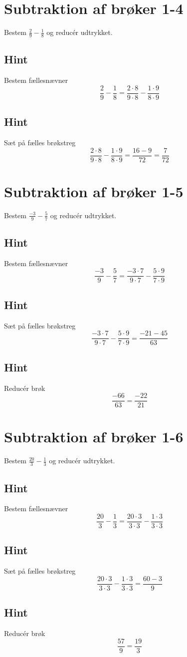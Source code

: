\documentclass{article}
\newenvironment{exercise}[1]{\newpage\section{#1}}{}
\newcommand{\answerbox}[1]{\fbox{$#1$}}
\newcommand{\hint}{\subsection*{Hint}}
\begin{document}
	\newpage
	
	\begin{exercise}{Subtraktion af brøker 1-4}
		
		Bestem $\frac{2}{9}-\frac{1}{8}$ og reducér udtrykket.
		
		\answerbox{\frac{7}{72}}
		
		\hint
		
		Bestem fællesnævner
		\[
		\frac{2}{9}-\frac{1}{8}  = \frac{2 \cdot 8}{9 \cdot 8}-\frac{1 \cdot 9}{8\cdot 9} 
		\]
		
		\hint
		
		Sæt på fælles brøkstreg
		\[
		\frac{2 \cdot 8}{9 \cdot 8}-\frac{1 \cdot 9}{8\cdot 9}    = \frac{16-9}{72}  = \frac{7}{72}
		\]
		
		
	\end{exercise}
	
	\newpage
	
	\begin{exercise}{Subtraktion af brøker 1-5}
		
		Bestem $\frac{-3}{9}-\frac{5}{7}$ og reducér udtrykket.
		
		\answerbox{\frac{-22}{21}}
		
		\hint
		
		Bestem fællesnævner
		\[
		\frac{-3}{9}-\frac{5}{7}  = \frac{-3 \cdot 7}{9 \cdot 7}-\frac{5 \cdot 9}{7 \cdot 9} 
		\]
		
		\hint
		
		Sæt på fælles brøkstreg
		\[
		\frac{-3 \cdot 7}{9 \cdot 7}-\frac{5 \cdot 9}{7 \cdot 9}     = \frac{-21-45}{63} 
		\]
		
		\hint
		
		Reducér brøk
		\[
		\frac{-66}{63} = \frac{-22}{21}
		\]
		
	\end{exercise}
	
	\newpage
	
	\begin{exercise}{Subtraktion af brøker 1-6}
		
		Bestem $\frac{20}{3}-\frac{1}{3}$ og reducér udtrykket.
		
		\answerbox{\frac{19}{3}}
		
		\hint
		
		Bestem fællesnævner
		\[
		\frac{20}{3}-\frac{1}{3}  = \frac{20 \cdot 3}{3 \cdot 3}-\frac{1 \cdot 3}{3 \cdot 3} 
		\]
		
		\hint
		
		Sæt på fælles brøkstreg
		\[
		\frac{20 \cdot 3}{3 \cdot 3}-\frac{1 \cdot 3}{3 \cdot 3}   = \frac{60-3}{9} 
		\]
		
		\hint
		
		Reducér brøk
		\[
		\frac{57}{9} = \frac{19}{3}
		\]
		
	\end{exercise}
\end{document}
